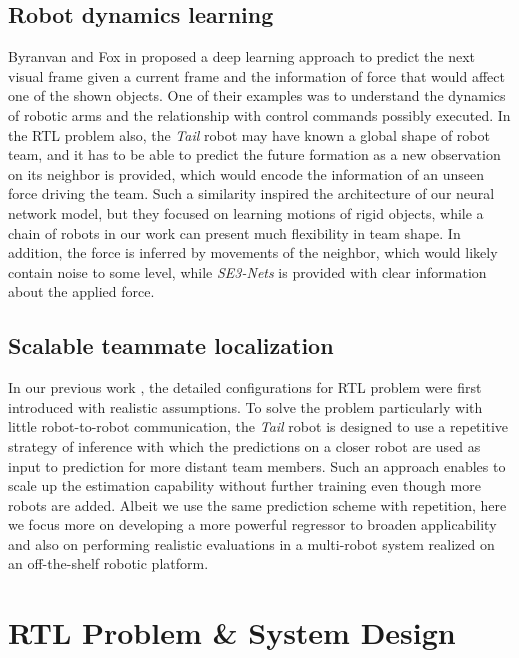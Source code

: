 \documentclass[letterpaper, 10 pt, conference]{ieeeconf}  %
\begin{document}
	\subsection{Robot dynamics learning}
	\label{sec:robot_dynamics_learning}

	Byranvan and Fox in \cite{BF17} proposed a deep learning approach
	to predict the next visual frame given a current frame and the information
	of force that would affect one of the shown objects. One of their examples was
	to understand the dynamics of robotic arms and the relationship with control
	commands possibly executed. In the RTL problem also, the \emph{Tail} robot may
	have known
	a global shape of robot team, and it has to be able to predict the future
	formation as a new observation on its neighbor is provided, which would encode
	the information of an unseen force driving the team. Such a similarity inspired
	the architecture of our neural network model, but they focused on learning
	motions of rigid objects, while a chain of robots in our work can present
	much flexibility in team shape. In addition, the force is inferred by
	movements of the neighbor, which would likely contain noise to some level, while
	\emph{SE3-Nets} is provided with clear information about the applied force.

	\subsection{Scalable teammate localization}
	\label{sec:scalable_teammate_localization}

	In our previous work \cite{CPR17}, the detailed configurations for RTL
	problem were first introduced with realistic assumptions.
	To solve the problem particularly with little robot-to-robot communication,
	the \emph{Tail} robot is designed to use a repetitive strategy of inference
	with which the predictions on a closer robot are used as input to
	prediction for more distant team members. Such an approach enables to scale
	up the estimation capability without further training even though more robots are
	added. Albeit we use the same prediction scheme with repetition, here we focus
	more on developing a more powerful regressor to broaden applicability and
	also on performing realistic evaluations in a multi-robot system realized on
	an off-the-shelf robotic platform.


	\section{RTL Problem \& System Design}
	\label{sec:rtl_problem}
\end{document}
